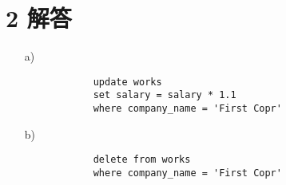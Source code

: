 \documentclass{article}
\begin{document}
	\section*{2 解答}
	
	\begin{enumerate}[noitemsep, label={{\arabic*})}]
		\item[a)] 
		
		\begin{verbatim}
			update works
			set salary = salary * 1.1
			where company_name = 'First Copr'
		\end{verbatim}
		
		\item[b)]
		
		\begin{verbatim}
			delete from works
			where company_name = 'First Copr'
		\end{verbatim}
		
	\end{enumerate}\textbf{}
	
\end{document}
